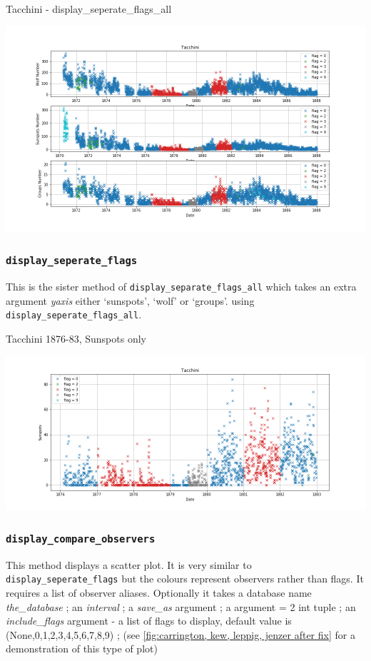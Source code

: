 \documentclass[12pt]{article}
\begin{document}
{\centering
\caption{Tacchini - display\_seperate\_flags\_all}
\includegraphics[width=\linewidth]{tacchini_pached.png}
\label{fig:tacchini display seperate flags all}
\par}

\subsubsection{\texttt{display\_seperate\_flags}}
This is the sister method of \texttt{display\_separate\_flags\_all} which takes an extra argument \textit{yaxis} either `sunspots', `wolf' or `groups'.  using \texttt{display\_seperate\_flags\_all}.

{\centering
\caption{Tacchini 1876-83, Sunspots only}
\includegraphics[width=\linewidth]{Tacchini_patches.png}
\label{fig:tacchini display seperate flags sunspots}
\par}

\subsubsection{\texttt{display\_compare\_observers}}
This method displays a scatter plot. It is very similar to \texttt{display\_seperate\_flags} but the colours represent observers rather than flags. It requires a list of observer aliases. Optionally it takes a database name \textit{the\_database} ; an \textit{interval} ; a \textit{save\_as} argument ; a  argument = 2 int tuple ; an \textit{include\_flags} argument - a list of flags to display, default value is (None,0,1,2,3,4,5,6,7,8,9) ; (see \ref{fig:carrington, kew, leppig, jenzer after fix} for a demonstration of this type of plot)
\end{document}
